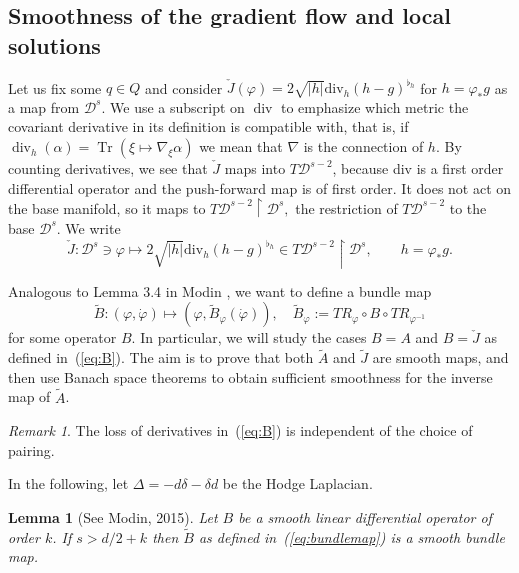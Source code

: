 \documentclass[a5paper,10pt,twoside]{article}
\newcommand{\cD}{\ensuremath{\mathcal{D}}}
\DeclareMathOperator*{\Tr}{Tr}
\DeclareMathOperator*{\Div}{div}
\theoremstyle{plain}
\newtheorem{lem}[teo]{Lemma}
\theoremstyle{definition}
\theoremstyle{remark}
\newtheorem{rem}[teo]{Remark}
\begin{document}
\subsection{Smoothness of the gradient flow and local solutions}
Let us fix some $q\in Q$ and 
consider $\check{J}(\varphi)=2\sqrt{|h|}\mathrm{div}_h(h-g)^{\flat_{h}}$ for $h=\varphi_*g$ 
as a map from $\cD^{s}$. 
We use a subscript on $\Div$ to emphasize which metric the covariant derivative in its definition is compatible with, that is, if $\Div_h(\alpha)=\Tr(\xi\mapsto\nabla_\xi \alpha)$ we mean that $\nabla$ is the connection of $h.$
By counting derivatives, we
see that $\check{J}$ maps into $T\cD^{s-2}$, because div is a
first order differential operator and the push-forward map is of first
order. It does not act on the base manifold,
so it maps to $T\cD^{s-2}\upharpoonright \cD^{s},$ the
restriction of $T\cD^{s-2}$ to the base $\cD^{s}$. We write
%
\begin{equation}
\label{eq:B}
\check{J}:\cD^{s}\ni\varphi\mapsto 2\sqrt{|h|}\mathrm{div}_h(h-g)^{\flat_{h}}\in T\cD^{s-2}\upharpoonright \cD^{s} ,\qquad h=\varphi_*g.
\end{equation}
%

Analogous to Lemma 3.4 in Modin \cite{modin2015generalized}, we want to define a bundle
map
%
\begin{equation} 
\label{eq:bundlemap}
\tilde{B}:(\varphi,\dot{\varphi})\mapsto(\varphi,\tilde{B}_{\varphi}(\dot{\varphi})),\quad\tilde{B}_{\varphi}:=TR_{\varphi}\circ B\circ TR_{\varphi^{-1}}
\end{equation}
%
for some operator $B.$ In particular, we will study the cases $B=A$ and $B=\check{J}$ as defined in~(\ref{eq:B}). The aim is to prove that both $\tilde{A}$ and $\tilde{J}$ are smooth maps, and then use Banach space theorems to obtain sufficient smoothness
for the inverse map of $\tilde{A}$.

\begin{rem}
	The loss of derivatives in~(\ref{eq:B}) is independent of the choice of pairing.
\end{rem}

In the following, let $\Delta=-d\delta-\delta d$ be the Hodge Laplacian.

\begin{lem}[See Modin, 2015]
	\label{lem:B-translate}
Let $B$ be a smooth linear differential operator of order $k$. If $s>d/2+k$ then $\tilde{B}$ as defined in~(\ref{eq:bundlemap}) is a smooth bundle map.
\end{lem}
\end{document}
